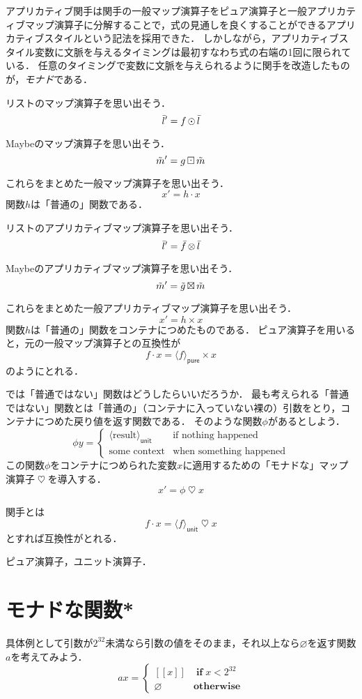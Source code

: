\documentclass[twocolumn]{jsbook}
\def\[{[\![}
\def\]{]\!]}
\newcommand{\keyword}[1]{\emph{#1}}
\DeclareMathOperator{\hsklApplicativeMap}{\times}
\DeclareMathOperator{\hsklApplicativeListMap}{\otimes}
\DeclareMathOperator{\hsklApplicativeMaybeMap}{\boxtimes}
\DeclareMathOperator{\hsklFmap}{\cdot}
\DeclareMathOperator{\hsklMap}{\odot}
\DeclareMathOperator{\hsklMaybeMap}{\boxdot}
\DeclareMathOperator{\hsklMonadMap}{\heartsuit}
\newcommand{\hsklNothing}{\varnothing}
\newcommand{\hsklJust}[1]{\[#1\]}
\newcommand{\hsklList}[1]{\Bar{#1}}
\newcommand{\hsklMaybe}[1]{\Tilde{#1}}
\newcommand{\hsklPure}[1]{\langle#1\rangle_\textsf{pure}}
\newcommand{\hsklUnit}[1]{\langle#1\rangle_\textsf{unit}}
\newcommand{\mathKeyword}[1]{\mathbf{#1}}
\DeclareMathOperator{\mathIf}{\mathKeyword{if}}
\newcommand{\mathOtherwise}{\mathKeyword{otherwise}}
\begin{document}
アプリカティブ関手は関手の一般マップ演算子をピュア演算子と一般アプリカティブマップ演算子に分解することで，式の見通しを良くすることができるアプリカティブスタイルという記法を採用できた．
しかしながら，アプリカティブスタイル変数に文脈を与えるタイミングは最初すなわち式の右端の1回に限られている．
任意のタイミングで変数に文脈を与えられるように関手を改造したものが，\keyword{モナド}である．

リストのマップ演算子を思い出そう．
$$\hsklList{l}'=f\hsklMap\hsklList{l}$$

Maybeのマップ演算子を思い出そう．
$$\hsklMaybe{m}'=g\hsklMaybeMap\hsklMaybe{m}$$

これらをまとめた一般マップ演算子を思い出そう．
$$x'=h\hsklFmap x$$
関数$h$は「普通の」関数である．

リストのアプリカティブマップ演算子を思い出そう．
$$\hsklList{l}'=\hsklList{f}\hsklApplicativeListMap\hsklList{l}$$

Maybeのアプリカティブマップ演算子を思い出そう．
$$\hsklMaybe{m}'=\hsklMaybe{g}\hsklApplicativeMaybeMap\hsklMaybe{m}$$

これらをまとめた一般アプリカティブマップ演算子を思い出そう．
$$x'=h\hsklApplicativeMap x$$
関数$h$は「普通の」関数をコンテナにつめたものである．
ピュア演算子を用いると，元の一般マップ演算子との互換性が$$f\hsklFmap x=\hsklPure{f}\hsklApplicativeMap x$$のようにとれる．

では「普通ではない」関数はどうしたらいいだろうか．
最も考えられる「普通ではない」関数とは「普通の」（コンテナに入っていない裸の）引数をとり，コンテナにつめた戻り値を返す関数である．
そのような関数$\phi$があるとしよう．
$$\phi y=\begin{cases}\hsklUnit{\text{result}}&\text{if nothing happened}\\
\text{some context}&\text{when something happened}\end{cases}$$
この関数$\phi$をコンテナにつめられた変数$x$に適用するための「モナドな」マップ演算子$\hsklMonadMap$を導入する．
$$x'=\phi\hsklMonadMap x$$

関手とは
$$f\hsklFmap x=\hsklUnit{f}\hsklMonadMap x$$
とすれば互換性がとれる．


ピュア演算子，ユニット演算子．

\section{モナドな関数*}

具体例として引数が$2^{32}$未満なら引数の値をそのまま，それ以上なら$\hsklNothing$を返す関数$a$を考えてみよう．
\begin{equation*}
ax=\begin{cases}
\hsklJust{x}&\mathIf x<2^{32}\\
\hsklNothing&\mathOtherwise
\end{cases}
\end{equation*}
\end{document}
